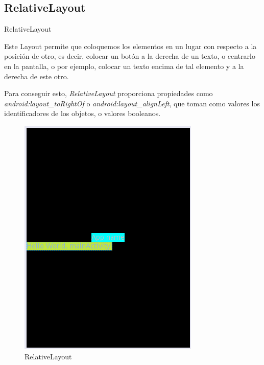 \subsection{RelativeLayout}

\begin{frame}{RelativeLayout}
    \begin{block}{}
Este Layout permite que coloquemos los elementos en un lugar con respecto a la posición de otro, es decir, colocar un botón a la derecha de un texto, o centrarlo en la pantalla, o por ejemplo, colocar un texto encima de tal elemento y a la derecha de este otro.

Para conseguir esto, \textit{{RelativeLayout}} proporciona propiedades como \textit{{android:layout\_toRightOf}} o \textit{{android:layout\_alignLeft}}, que toman como valores los identificadores de los objetos, o valores booleanos.
    \end{block}
\end{frame}

\begin{frame}
    \begin{block}{}
\begin{figure}[H]
    \centering\includegraphics[scale=.45]{./img/RelativeLayout.png}
    \caption{RelativeLayout}
\end{figure}
    \end{block}
\end{frame}

